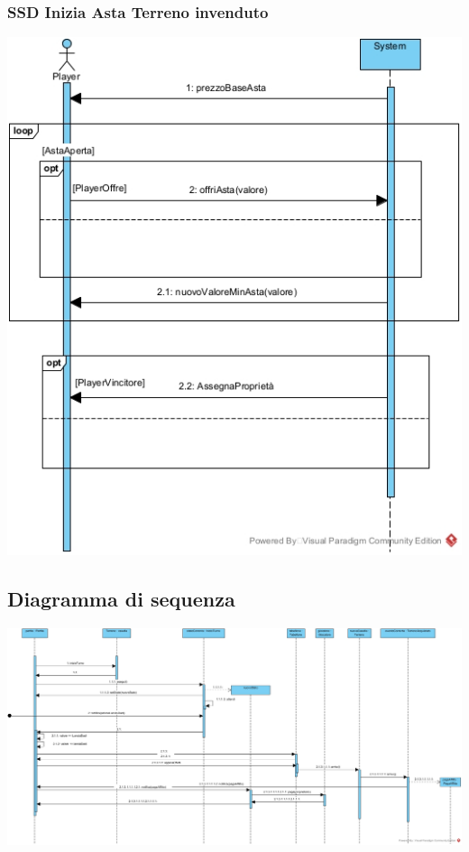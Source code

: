 \documentclass{article}
\begin{document}
\subsubsection{SSD Inizia Asta Terreno invenduto}
\includegraphics[width=\textwidth]{SSD_IniziaAsta_Invenduta}

\subsection{Diagramma di sequenza}
\href{https://github.com/UnimibSoftEngCourse2022/progetto-monopoly-1-gangoffour2/blob/feat/doc/doc/img/DiagrammaDiSequenzaDiProgettazioneTurnoGiocatore.jpg?raw=true}
	{\includegraphics[width=\textwidth]{DiagrammaDiSequenzaDiProgettazioneTurnoGiocatore}}
\end{document}
